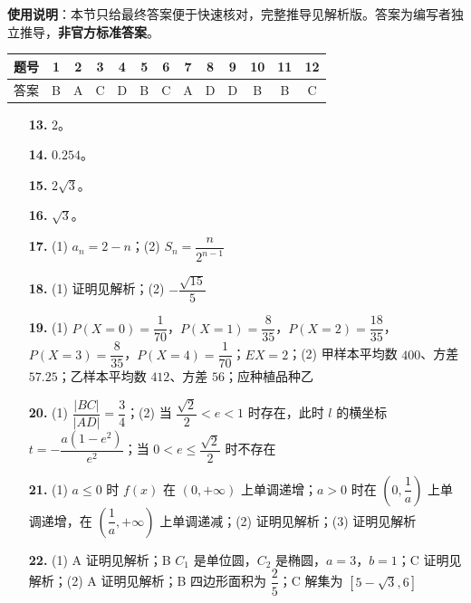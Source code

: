
\begin{gknotice}
\textbf{使用说明}：本节只给最终答案便于快速核对，完整推导见解析版。答案为编写者独立推导，\textbf{非官方标准答案}。
\end{gknotice}

\begin{center}\begin{tabular}{ccccccccccccc}
\toprule
题号 & 1 & 2 & 3 & 4 & 5 & 6 & 7 & 8 & 9 & 10 & 11 & 12 \\
\midrule
答案 & B & A & C & D & B & C & A & D & D & B & B & C \\
\bottomrule
\end{tabular}\end{center}

\begin{itemize}[leftmargin=2.6em]
  \item[\textbf{13.}] $2$。
  \item[\textbf{14.}] $0.254$。
  \item[\textbf{15.}] $2\sqrt3$。
  \item[\textbf{16.}] $\sqrt3$。
\end{itemize}

\begin{itemize}[leftmargin=2.6em]
  \item[\textbf{17.}] (1) $a_n=2-n$；(2) $S_n=\dfrac{n}{2^{n-1}}$
  \item[\textbf{18.}] (1) 证明见解析；(2) $-\dfrac{\sqrt{15}}5$
  \item[\textbf{19.}] (1) $P(X=0)=\dfrac1{70}$，$P(X=1)=\dfrac8{35}$，$P(X=2)=\dfrac{18}{35}$，$P(X=3)=\dfrac8{35}$，$P(X=4)=\dfrac1{70}$；$EX=2$；(2) 甲样本平均数 $400$、方差 $57.25$；乙样本平均数 $412$、方差 $56$；应种植品种乙
  \item[\textbf{20.}] (1) $\dfrac{|BC|}{|AD|}=\dfrac34$；(2) 当 $\dfrac{\sqrt2}2<e<1$ 时存在，此时 $l$ 的横坐标 $t=-\dfrac{a(1-e^2)}{e^2}$；当 $0<e\leqslant\dfrac{\sqrt2}2$ 时不存在
  \item[\textbf{21.}] (1) $a\leqslant0$ 时 $f(x)$ 在 $(0,+\infty)$ 上单调递增；$a>0$ 时在 $\left(0,\dfrac1a\right)$ 上单调递增，在 $\left(\dfrac1a,+\infty\right)$ 上单调递减；(2) 证明见解析；(3) 证明见解析
  \item[\textbf{22.}] (1) A 证明见解析；B $C_1$ 是单位圆，$C_2$ 是椭圆，$a=3$，$b=1$；C 证明见解析；(2) A 证明见解析；B 四边形面积为 $\dfrac25$；C 解集为 $[5-\sqrt3,6]$
\end{itemize}
